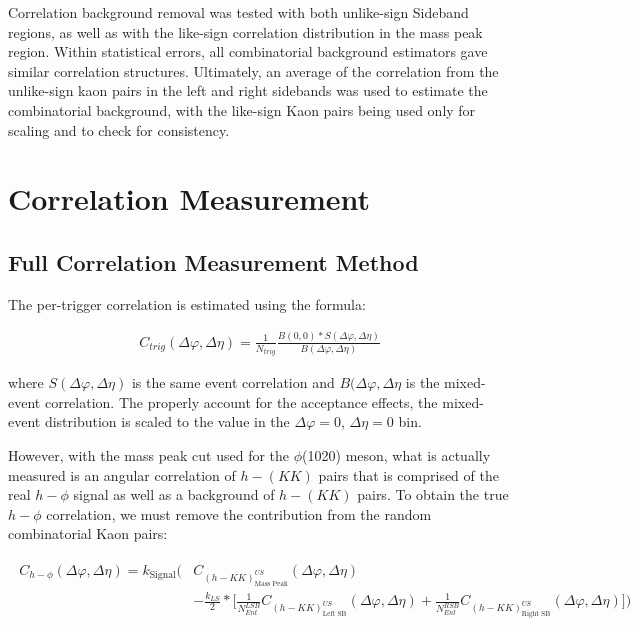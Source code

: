 \documentclass[ALICE,manyauthors]{ALICE_analysis_notes}
\begin{document}
Correlation background removal was tested with both unlike-sign Sideband regions, as well as with the like-sign correlation distribution in the mass peak region. Within statistical errors, all combinatorial background estimators gave similar correlation structures. Ultimately, an average of the correlation from the unlike-sign kaon pairs in the left and right sidebands was used to estimate the combinatorial background, with the like-sign Kaon pairs being used only for scaling and to check for consistency.

\section{Correlation Measurement}
\label{corrsec}
\subsection{Full Correlation Measurement Method}

The per-trigger correlation is estimated using the formula:

\begin{align}
\label{perTrigEq}
C_{trig}(\Delta\varphi, \Delta\eta) = \frac{1}{N_{trig}}\frac{B(0,0)*S(\Delta\varphi,\Delta\eta)}{B(\Delta\varphi, \Delta\eta)}
\end{align}

where $S(\Delta\varphi, \Delta\eta)$ is the same event correlation and $B(\Delta\varphi, \Delta\eta$ is the mixed-event correlation.  The properly account for the acceptance effects, the mixed-event distribution is scaled to the value in the $\Delta\varphi = 0$, $\Delta\eta = 0$ bin.

However, with the mass peak cut used for the $\phi$(1020) meson, what is actually measured is an angular correlation of $h-(KK)$ pairs that is comprised of the real $h-\phi$ signal as well as a background of $h-(KK)$ pairs.  To obtain the true $h-\phi$ correlation, we must remove the contribution from the random combinatorial Kaon pairs:

\begin{align}
\label{fullCorrEq}
\begin{split}
    C_{h-\phi}(\Delta\varphi, \Delta\eta) = k_{\text{Signal}}\biggl(&C_{(h-KK)^{US}_{\text{Mass Peak}}}(\Delta\varphi, \Delta\eta)\\
    &- \frac{k_{LS}}{2}*\biggl[\frac{1}{N_{Ent}^{LSB}}C_{(h-KK)^{US}_{\text{Left SB}}}(\Delta\varphi, \Delta\eta) + \frac{1}{N_{Ent}^{RSB}}C_{(h-KK)^{US}_{\text{Right SB}}}(\Delta\varphi, \Delta\eta) \biggr]\biggr)
\end{split}
\end{align}
\end{document}
